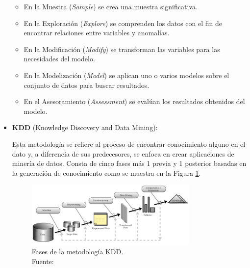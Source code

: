 \begin{itemize}
	\begin{itemize}
		\item En la Muestra (\textit{Sample}) se crea una muestra significativa.
		\item En la Exploración (\textit{Explore}) se comprenden los datos con el fin de encontrar relaciones entre variables y anomalías.
		\item En la Modificación (\textit{Modify}) se transforman las variables para las necesidades del modelo.
		\item En la Modelización (\textit{Model}) se aplican uno o varios modelos sobre el conjunto de datos para buscar resultados.
		\item En el Asesoramiento (\textit{Assessment}) se evalúan los resultados obtenidos del modelo.
	\end{itemize}
	
	\item \textbf{KDD} (Knowledge Discovery and Data Mining):
	
	Esta metodología se refiere al proceso de encontrar conocimiento alguno en el dato y, a diferencia de sus predecesores, se enfoca en crear aplicaciones de minería de datos. Consta de cinco fases más 1 previa y 1 posterior basadas en la generación de conocimiento como se muestra en la Figura \ref{2:fig9}.
	\begin{figure}[h]
		\begin{center}
			\includegraphics[width=0.80\textwidth]{2/figures/kdd.jpg}
			\caption[Fases de la metodología KDD]{Fases de la metodología KDD.\\
			Fuente: \cite{tec_braulio2015metodologiasdm}}
			\label{2:fig9}
		\end{center}
	\end{figure}
	

\end{itemize}
